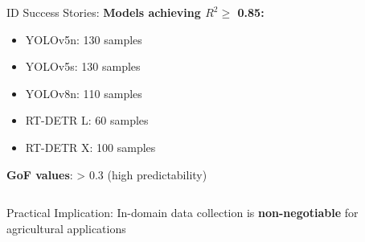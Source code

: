 \documentclass[aspectratio=43]{beamer}
\begin{document}
\begin{frame}
\begin{columns}
        \begin{column}{0.5\textwidth}
            \begin{exampleblock}{ID Success Stories:}
                \small
                \textbf{Models achieving $R^2 \geq$ 0.85:}
                \begin{itemize}
                    \item YOLOv5n: 130 samples
                    \item YOLOv5s: 130 samples  
                    \item YOLOv8n: 110 samples
                    \item RT-DETR L: 60 samples
                    \item RT-DETR X: 100 samples
                \end{itemize}
                
                \textbf{GoF values}: > 0.3 (high predictability)
            \end{exampleblock}
        \end{column}
    \end{columns}
    
    \begin{block}{Practical Implication:}
        \small In-domain data collection is \textbf{non-negotiable} for agricultural applications
    \end{block}
\end{frame}
\end{document}
